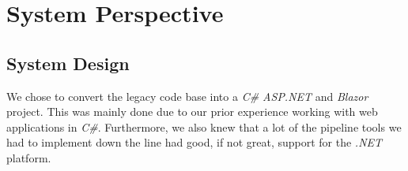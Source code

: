 \newpage
\section{System Perspective}
\label{sec:mpt}

    
    
    
    
    


\subsection{System Design}
We chose to convert the legacy code base into a \textit{C\# ASP.NET} and \textit{Blazor} project. This was mainly done due to our prior experience working with web applications in \textit{C\#}. Furthermore, we also knew that a lot of the pipeline tools we had to implement down the line had good, if not great, support for the \textit{.NET} platform.

